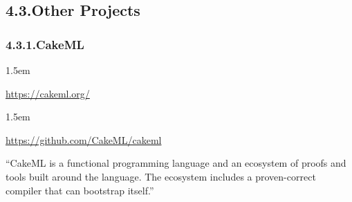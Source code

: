 \documentclass[12pt,twoside]{article}
\begin{document}
\subsection{4.3.\hspace*{0.5em}Other Projects}\label{sec-other-projects}%

\subsubsection{4.3.1.\hspace*{0.5em}CakeML}\label{sec-cakeml}%

\begin{mddefinitions}%


\begin{mdbmarginx}{}{}{}{1.5em}%
\begin{mddefdata}%
\href{https://cakeml.org/}{{\ttfamily https://\hspace{0pt}cakeml.\hspace{0pt}org/\hspace{0pt}}}
\end{mddefdata}%
\end{mdbmarginx}%


\begin{mdbmarginx}{}{}{}{1.5em}%
\begin{mddefdata}%
\href{https://github.com/CakeML/cakeml}{{\ttfamily https://\hspace{0pt}github.\hspace{0pt}com/\hspace{0pt}CakeML/\hspace{0pt}cakeml}}%
\end{mddefdata}%
\end{mdbmarginx}%
\end{mddefinitions}%

\noindent{}\textquotedblleft{}CakeML is a functional programming language and an ecosystem of proofs
and tools built around the language. The ecosystem includes a
proven-correct compiler that can bootstrap itself.\textquotedblright{}%
\end{document}
